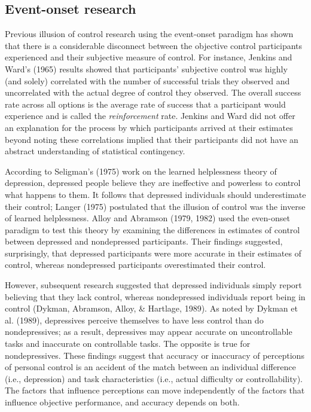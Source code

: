 \documentclass[USenglish,letterpaper,12pt,extrafontsizes,oneside,onecolumn,final]{memoir}
\begin{document}
\subsection{Event-onset research}
 
Previous illusion of control research using the event-onset paradigm has shown that there is a considerable disconnect between the objective control participants experienced and their subjective measure of control.  For instance, Jenkins and Ward's (1965) results showed that participants' subjective control was highly (and solely) correlated with the number of successful trials they observed and uncorrelated with the actual degree of control they observed. The overall success rate across all options is the average rate of success that a participant would experience and is called the \emph{reinforcement} rate. Jenkins and Ward did not offer an explanation for the process by which participants arrived at their estimates beyond noting these correlations implied that their participants did not have an abstract understanding of statistical contingency. 

According to Seligman's (1975) work on the learned helplessness theory of depression, depressed people believe they are ineffective and powerless to control what happens to them. It follows that depressed individuals should underestimate their control; Langer (1975) postulated that the illusion of control was the inverse of learned helplessness. Alloy and Abramson (1979, 1982) used the even-onset paradigm to test this theory by examining the differences in estimates of control between depressed and nondepressed participants. Their findings suggested, surprisingly, that depressed participants were more accurate in their estimates of control, whereas nondepressed participants overestimated their control.   

However, subsequent research suggested that depressed individuals simply report believing that they lack control, whereas nondepressed individuals report being in control (Dykman, Abramson, Alloy, \& Hartlage, 1989). As noted by Dykman et al. (1989), depressives perceive themselves to have less control than do nondepressives; as a result, depressives may appear accurate on uncontrollable tasks and inaccurate on controllable tasks.  The opposite is true for nondepressives. These findings suggest that accuracy or inaccuracy of perceptions of personal control is an accident of the match between an individual difference (i.e., depression) and task characteristics (i.e., actual difficulty or controllability). The factors that influence perceptions can move independently of the factors that influence objective performance, and accuracy depends on both.
\end{document}
